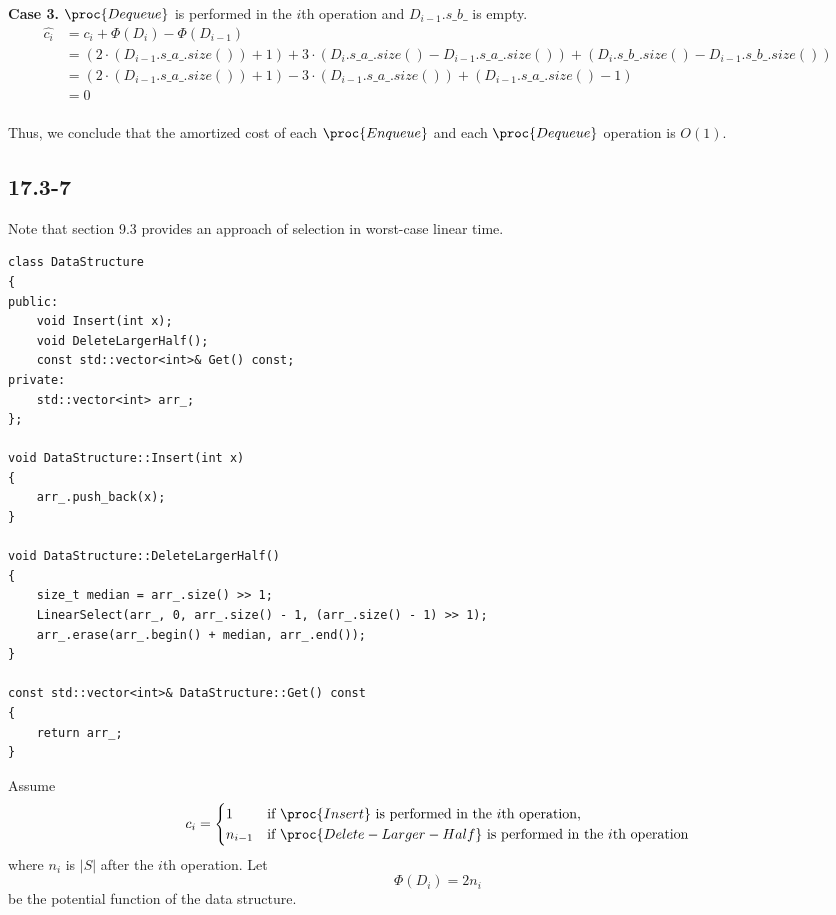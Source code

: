 \textbf{Case 3.} 
$\proc{Dequeue}$ is performed in the $i$th operation
and $D_{i-1}.s\_b\_$ is empty.
\begin{equation*}
\begin{split}
    \hat{c_i} & = c_i + \Phi(D_i) - \Phi(D_{i-1}) \\
    & = (2 \cdot (D_{i-1}.s\_a\_.size()) + 1)
         + 3 \cdot (D_i.s\_a\_.size() - D_{i-1}.s\_a\_.size()) 
        + (D_i.s\_b\_.size() - D_{i-1}.s\_b\_.size())\\
    & = (2 \cdot (D_{i-1}.s\_a\_.size()) + 1) 
        - 3 \cdot (D_{i-1}.s\_a\_.size()) + (D_{i-1}.s\_a\_.size() - 1) \\
    & = 0 \\
\end{split}
\end{equation*}

Thus, we conclude that the amortized cost of each
$\proc{Enqueue}$ and each $\proc{Dequeue}$ operation
is $O(1)$.

\subsection*{17.3-7}

Note that section 9.3 provides an approach of selection in worst-case linear time.

\begin{verbatim}
class DataStructure
{
public:
    void Insert(int x);
    void DeleteLargerHalf();
    const std::vector<int>& Get() const;
private:
    std::vector<int> arr_;
};

void DataStructure::Insert(int x)
{
    arr_.push_back(x);
}

void DataStructure::DeleteLargerHalf()
{
    size_t median = arr_.size() >> 1;
    LinearSelect(arr_, 0, arr_.size() - 1, (arr_.size() - 1) >> 1);
    arr_.erase(arr_.begin() + median, arr_.end());
}

const std::vector<int>& DataStructure::Get() const
{
    return arr_;
}
\end{verbatim}

Assume
\begin{equation*}
    c_i = 
    \begin{cases}
        1 & \text{if $\proc{Insert}$ is performed in the $i$th operation,} \\
        n_{i-1} & \text{if $\proc{Delete-Larger-Half}$ 
            is performed in the $i$th operation} \\
    \end{cases}
\end{equation*}
where $n_i$ is $|S|$ after the $i$th operation.
Let
\begin{equation*}
    \Phi(D_i) = 2n_i
\end{equation*}
be the potential function of the data structure.

